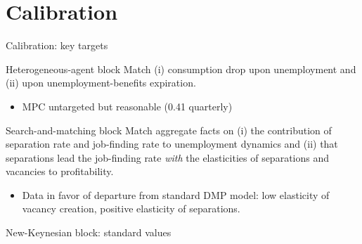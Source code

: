 \documentclass[aspectratio=169]{beamer}
\begin{document}
\section{Calibration}
\begin{frame}{Calibration: key targets}
	\label{slide:calibration}
    \begin{block}{Heterogeneous-agent block}
        Match (i) consumption drop upon unemployment and (ii) upon unemployment-benefits expiration.
        \begin{itemize}
            \item MPC untargeted but reasonable (0.41 quarterly)
        \end{itemize}
        \hyperlink{slide:ui}{}
        \hyperlink{slide:preferences}{}
        \hyperlink{slide:rel_job_finding}{}
    \end{block}

    \begin{block}{Search-and-matching block}
        Match aggregate facts on (i) the contribution of separation rate and job-finding rate to unemployment dynamics and (ii) that separations lead the job-finding rate \textit{with} the elasticities of separations and vacancies to profitability.
        \begin{itemize}
            \item Data in favor of departure from standard DMP model: low elasticity of vacancy creation, positive elasticity of separations.
        \end{itemize}
    \end{block}
    \hyperlink{slide:dyn_job_finding_seprations}{}

    \bigskip

    New-Keynesian block: standard values

\end{frame}
\end{document}
